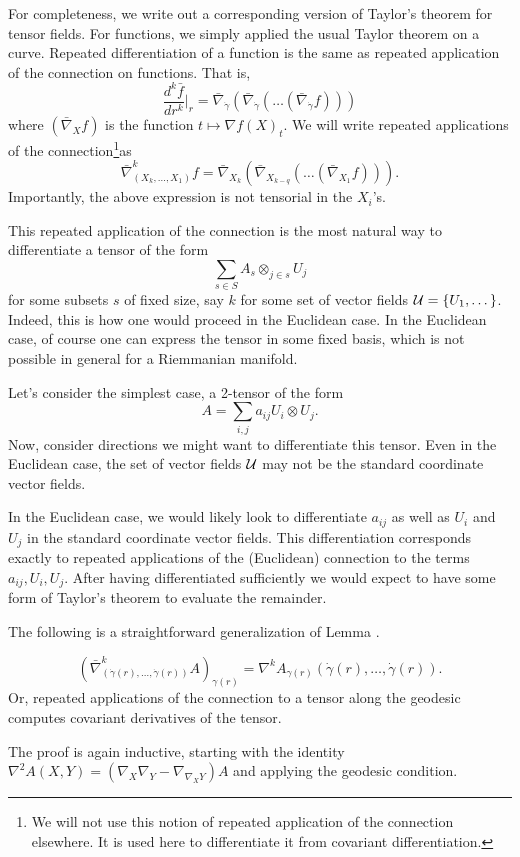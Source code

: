 \documentclass{article}
\begin{document}
For completeness, we write  out a corresponding version of Taylor's theorem for tensor fields. For functions, we simply applied
the usual Taylor theorem on a curve. Repeated differentiation of a function is the same
as repeated application of the connection on functions. That is,
$$
\frac{d^k \bar{f}}{dr^k}\biggl|_r = \bar{\nabla}_{\dot{\gamma}} \left(\bar{\nabla}_{\dot{\gamma}}\left(\dots \left(\bar{\nabla}_{\dot{\gamma}}f\right) \right)\right)
$$
where $(\bar{\nabla}_{X}f)$ is  the function $t \mapsto \nabla f(X)_t$. We will write repeated applications of the connection\footnote{We will not use this notion
of repeated application of the connection elsewhere. It is used here to differentiate it from covariant differentiation.}as
$$
\bar{\nabla}^k_{(X_k, \dots, X_1)} f = \bar{\nabla}_{X_k}\left(\bar{\nabla}_{X_{k-q}} \left( \dots \left(\bar{\nabla}_{X_1}f\right)\right)\right).
$$
Importantly, the above expression is not tensorial in the $X_i$'s.

This repeated application of the connection is the most
natural way to differentiate a tensor of the form
$$
\sum_{s \in S} A_s \otimes_{j \in s} U_j
$$
for some subsets $s$ of fixed size, say $k$ for some set of vector fields ${\cal U} = \{U_1, \dots\}$. Indeed, this is how one would proceed in the Euclidean case. In the Euclidean case, of course one can express the tensor in some fixed basis, which is
not possible in general for a Riemmanian manifold.

Let's consider the simplest case, a 2-tensor of the form
$$
A = \sum_{i,j} a_{ij} U_i \otimes U_j.
$$
Now, consider directions we might want to differentiate this tensor. Even in the Euclidean case, the set of vector fields ${\cal U}$ may not be the standard
coordinate vector fields.

In the Euclidean case, we would likely look to differentiate $a_{ij}$ as well as $U_i$ and $U_j$ in the standard coordinate vector fields.
This differentiation corresponds exactly to repeated applications of the (Euclidean) connection to the terms $a_{ij}, U_i, U_j$.
After having
differentiated sufficiently we would expect to have some form of Taylor's theorem to evaluate the remainder.

The following is a straightforward generalization of Lemma \cite{lem:geodesic}.
\begin{lemma}
$$
(\bar{\nabla}^k_{(\dot{\gamma}(r), \dots, \dot{\gamma}(r))}A)_{\gamma(r)}= \nabla^k A_{\gamma(r)}\left(\dot{\gamma}(r), \dots, \dot{\gamma}(r)\right).
$$
Or, repeated applications of the connection to a tensor along the geodesic computes covariant derivatives of the tensor. 
\end{lemma}
The proof is again inductive, starting with the identity $\nabla^2 A(X, Y) = (\nabla_X \nabla_Y - \nabla_{\nabla_XY})A$ and applying the geodesic condition.
\end{document}
